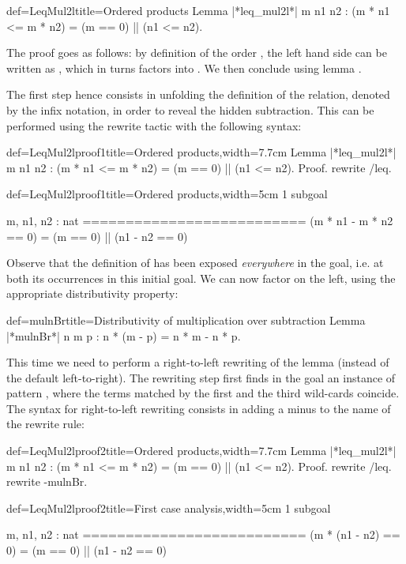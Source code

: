 \begin{coq}{def=LeqMul2l}{title=Ordered products}
Lemma |*leq_mul2l*| m n1 n2 : (m * n1 <= m * n2) = (m == 0) || (n1 <= n2).
\end{coq}

The proof goes as follows: by definition of the order \C{<=}, the left
hand side can be written as , which in turns
factors into . We then conclude using
lemma .

The first step hence consists in unfolding the definition of the
 relation, denoted by the \C{<=} infix notation, in order to
reveal the hidden subtraction. This can be performed using the rewrite
tactic with the following syntax:

\begin{coq}{def=LeqMul2lproof1}{title=Ordered products,width=7.7cm}
Lemma |*leq_mul2l*| m n1 n2 :
(m * n1 <= m * n2) = (m == 0) || (n1 <= n2).
Proof.
rewrite /leq.
\end{coq}
\begin{coqout}{def=LeqMul2lproof1}{title=Ordered products,width=5cm}
1 subgoal

m, n1, n2 : nat
==========================
(m * n1 - m * n2 == 0) =
(m == 0) || (n1 - n2 == 0)
\end{coqout}

Observe that the definition of \C{<=} has been exposed
\emph{everywhere} in the goal, i.e. at both its occurrences in this
initial goal. We can now factor  on the left, using the appropriate
distributivity property:

\begin{coq}{def=mulnBr}{title=Distributivity of multiplication over subtraction}
Lemma |*mulnBr*| n m p : n * (m - p) = n * m - n * p.
\end{coq}
This time we need to perform a right-to-left rewriting of the
 lemma (instead of the
default left-to-right). The rewriting step first finds in the goal an
instance of pattern \C{(_ * _ - _ * _)}, where the terms matched by
the first and the third wild-cards coincide. The syntax for
right-to-left rewriting consists in adding a minus \C{-} to the name
of the rewrite rule:


\begin{coq}{def=LeqMul2lproof2}{title=Ordered products,width=7.7cm}
Lemma |*leq_mul2l*| m n1 n2 :
(m * n1 <= m * n2) = (m == 0) || (n1 <= n2).
Proof.
rewrite /leq.
rewrite -mulnBr.
\end{coq}
\begin{coqout}{def=LeqMul2lproof2}{title=First case analysis,width=5cm}
1 subgoal

m, n1, n2 : nat
==========================
(m * (n1 - n2) == 0) =
(m == 0) || (n1 - n2 == 0)
\end{coqout}

